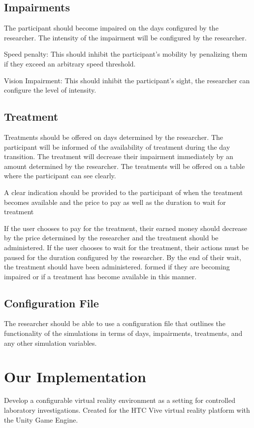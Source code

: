 \documentclass{article}
\begin{document}
\subsection{Impairments}
The participant should become impaired on the days configured by the researcher. The intensity of the impairment will be configured by the researcher.

Speed penalty:  This should inhibit the participant's mobility by penalizing them if they exceed an arbitrary speed threshold.

Vision Impairment: This should inhibit the participant’s sight, the researcher can configure the level of intensity.


\subsection{Treatment}
Treatments should be offered on days determined by the researcher. The participant will be informed of the availability of treatment during the day transition. The treatment will decrease their impairment immediately by an amount determined by the researcher. The treatments will be offered on a table where the participant can see clearly. 

A clear indication should be provided to the participant of when the treatment becomes available and the price to pay as well as the duration to wait for treatment

If the user chooses to pay for the treatment, their earned money should decrease by the price determined by the researcher and the treatment should be administered. If the user chooses to wait for the treatment, their actions must be paused for the duration configured by the researcher. By the end of their wait, the treatment should have been administered.
formed if they are becoming impaired or if a treatment has become available in this manner.

\subsection{Configuration File}
The researcher should be able to use a configuration file that outlines the functionality of the simulations in terms of days, impairments, treatments, and any other simulation variables.

\section{Our Implementation}
Develop a configurable virtual reality environment as a setting for controlled laboratory investigations. Created for the HTC Vive virtual reality platform with the Unity Game Engine.
\end{document}
